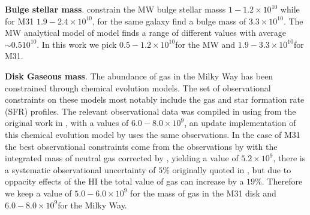 \documentclass[usenatbib]{mn2e}
\newcommand{\Msun}{{\ifmmode{{\rm {M_{\odot}}}}\else{${\rm{M_{\odot}}}$}\fi}}
\begin{document}
{\bf Bulge stellar mass}. \cite{Klypin2002} constrain the MW bulge stellar masss $1-1.2\times 10^{10}$ \Msun while for M31 $1.9-2.4\times 10^{10}$, for the same galaxy \citep{Geehan2006} find a bulge mass of $3.3\times 10^{10}$\Msun. The MW analytical model of model \citep{Dehnen1998} finds a range of different values with average $\sim 0.5 10^{10}$\Msun. In this work we pick $0.5-1.2 \times 10^{10}$\Msun for the MW and $1.9-3.3\times 10^{10}$\Msun for M31.

{\bf Disk Gaseous mass}. The abundance of gas in the Milky Way has been constrained through chemical evolution models. The set of observational constraints on these models most notably include the gas and star formation rate (SFR) profiles. The relevant observational data was compiled in \citep{Boissier99} using from the original work in \cite{Kulkarni87,Dame93}, with a values of $6.0-8.0 \times 10^{9}$\Msun, an update implementation of this chemical evolution model by  uses the same observations. In the case of M31 the best observational constraints come from the observations by \citep{Cram80} with the integrated mass of neutral gas corrected by \citep{Dame93}, yielding a value of $5.2\times 10^{9}$\Msun, there is a systematic observational uncertainty of $5\%$ originally quoted in \citep{Cram80}, but due to oppacity effects of the HI \citep{Braun92} the total value of gas can increase by a $19\%$. Therefore we keep a value of $5.0-6.0\times 10^{9}$ for the mass of gas in the M31 disk and $6.0-8.0\times 10^{9}$\Msun for the Milky Way. 




 
\end{document}
